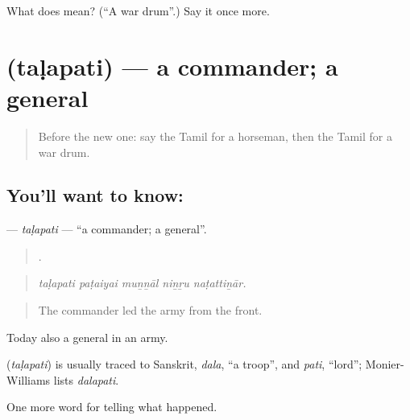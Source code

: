 \begin{tcolorbox}[breakable,colback=teal!4,colframe=teal!35!black,title={Before you move on}]
What does  mean? (\textquotedblleft{}A war drum\textquotedblright{}.) Say it once more.
\end{tcolorbox}
\section[\texorpdfstring{\ta{தளபதி} (taḷapati)}{தளபதி (taḷapati)}]{ (taḷapati) — a commander; a general}

\label{lesson:TA-C334-talapati}



\begin{quote}
Before the new one: say the Tamil for a horseman, then the Tamil for a war drum.
\end{quote}

\subsection*{You'll want to know: }
\textbf{} — \emph{taḷapati} — \textquotedblleft{}a commander; a general\textquotedblright{}.

\begin{quote}
    .
\end{quote}

\begin{quote}
\emph{taḷapati paṭaiyai muṉṉāl niṉṟu naṭattiṉār.}
\end{quote}

\begin{quote}
The commander led the army from the front.
\end{quote}

Today also a general in an army.

\begin{cousinweb}
\textbf{} (\emph{taḷapati}) is usually traced to Sanskrit, \emph{dala}, \textquotedblleft{}a troop\textquotedblright{}, and \emph{pati}, \textquotedblleft{}lord\textquotedblright{}; Monier-Williams lists \emph{dalapati}.
\end{cousinweb}

\begin{grammarlens}[title={What you've built}]
One more word for telling what happened.
\end{grammarlens}


